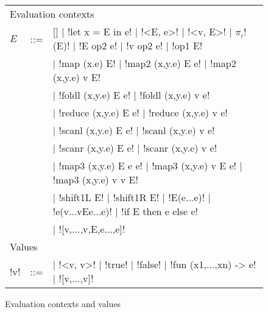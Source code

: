 \begin{figure*}[t]
    \begin{tabular}{|l c l|}
        \hline
        \multicolumn{3}{|l|}{Evaluation contexts} \\
        $E$ & \mbox{::=} & 
        [] 
        $\mid$ !let x = E in e! 
        $\mid$ !<E, e>!
        $\mid$ !<v, E>!
        $\mid$ $\pi_i$!(E)!
        $\mid$ !E op2 e!
        $\mid$ !v op2 e!
        $\mid$ !op1 E! \\
        && $\mid$ !map (x.e) E!
        $\mid$ !map2 (x,y.e) E e!
        $\mid$ !map2 (x,y.e) v E! \\
        && $\mid$ !foldl (x,y.e) E e!
        $\mid$ !foldl (x,y.e) v e! \\
        && $\mid$ !reduce (x,y.e) E e! 
        $\mid$ !reduce (x,y.e) v e! \\
        && $\mid$ !scanl (x,y.e) E e!
        $\mid$ !scanl (x,y.e) v e! \\
        && $\mid$ !scanr (x,y.e) E e!
        $\mid$ !scanr (x,y.e) v e! \\
        && $\mid$ !map3 (x,y.e) E e e!
        $\mid$ !map3 (x,y.e) v E e!
        $\mid$ !map3 (x,y.e) v v E! \\
        && $\mid$ !shift1L E! 
        $\mid$ !shift1R E!
        $\mid$ !E(e...e)!
        $\mid$ !e(v...vEe...e)!
        $\mid$ !if E then e else e! \\
        && $\mid$ ![v,...,v,E,e...,e]!
        \\ \hline
        \multicolumn{3}{|l|}{Values} \\ 
        !v! & \mbox{::=} & 
        \cnst{}  
        $\mid$ !<v, v>!
        $\mid$ !true! 
        $\mid$ !false!
        $\mid$ !fun (x1,...,xn) -> e!
        $\mid$ ![v,...,v]! 
        \\ \hline
        \end{tabular}
    \caption{Evaluation contexts and values}
\label{fig:ev_contexts}    
\end{figure*}